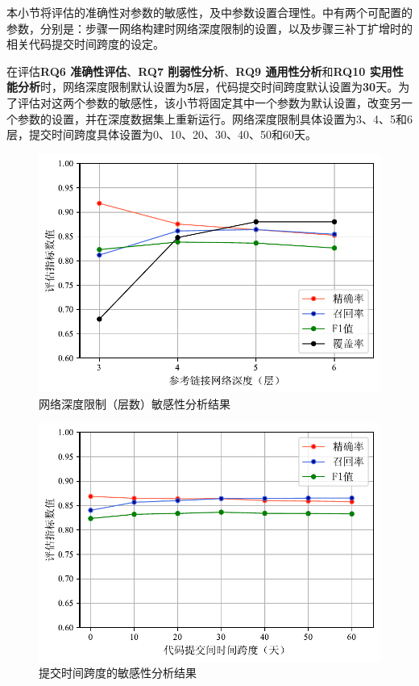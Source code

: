 本小节将评估\tool 的准确性对参数的敏感性，及\tool 中参数设置合理性。\tool 中有两个可配置的参数，分别是：\tool 步骤一网络构建时网络深度限制的设置，以及步骤三补丁扩增时的相关代码提交时间跨度的设定。

在评估\textbf{RQ6 准确性评估}、\textbf{RQ7 削弱性分析}、\textbf{RQ9 通用性分析}和\textbf{RQ10 实用性能分析}时，网络深度限制默认设置为\textbf{5}层，代码提交时间跨度默认设置为\textbf{30}天。为了评估\tool 对这两个参数的敏感性，该小节将固定其中一个参数为默认设置，改变另一个参数的设置，并在深度数据集上重新运行\tool 。网络深度限制具体设置为3、4、5和6层，提交时间跨度具体设置为0、10、20、30、40、50和60天。
\begin{figure}[!t]
    \centering
    \includegraphics[scale=0.9]{fig/rq8-sensitivity-depth.pdf}
    \caption{网络深度限制（层数）敏感性分析结果}\label{fig:depth}
\end{figure}

\begin{figure}[!t]
    \centering
    \includegraphics[scale=0.9]{fig/rq8-sensitivity-span.pdf}
    \caption{提交时间跨度的敏感性分析结果}\label{fig:span}
\end{figure}


